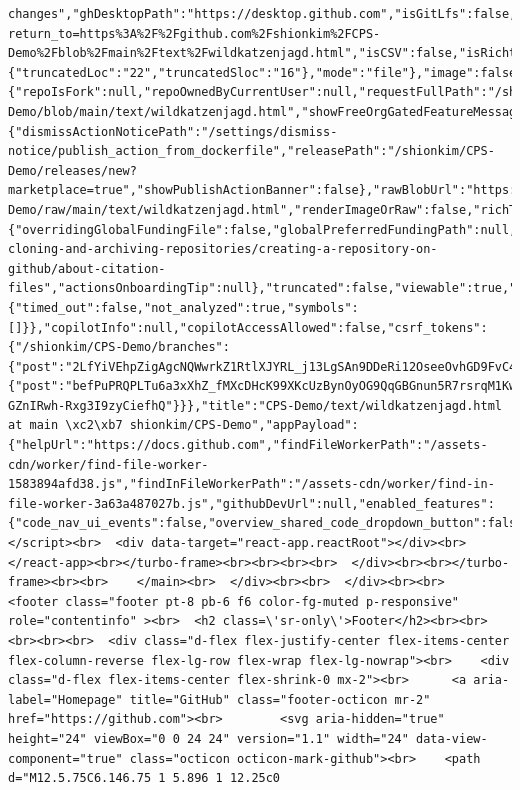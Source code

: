 \documentclass[
  letterpaper,
]{book}
\begin{document}
\begin{verbatim}
changes","ghDesktopPath":"https://desktop.github.com","isGitLfs":false,"onBranch":true,"shortPath":"0c9c3e5","siteNavLoginPath":"/login?return_to=https%3A%2F%2Fgithub.com%2Fshionkim%2FCPS-Demo%2Fblob%2Fmain%2Ftext%2Fwildkatzenjagd.html","isCSV":false,"isRichtext":false,"toc":null,"lineInfo":{"truncatedLoc":"22","truncatedSloc":"16"},"mode":"file"},"image":false,"isCodeownersFile":null,"isPlain":false,"isValidLegacyIssueTemplate":false,"issueTemplate":null,"discussionTemplate":null,"language":"HTML","languageID":146,"large":false,"planSupportInfo":{"repoIsFork":null,"repoOwnedByCurrentUser":null,"requestFullPath":"/shionkim/CPS-Demo/blob/main/text/wildkatzenjagd.html","showFreeOrgGatedFeatureMessage":null,"showPlanSupportBanner":null,"upgradeDataAttributes":null,"upgradePath":null},"publishBannersInfo":{"dismissActionNoticePath":"/settings/dismiss-notice/publish_action_from_dockerfile","releasePath":"/shionkim/CPS-Demo/releases/new?marketplace=true","showPublishActionBanner":false},"rawBlobUrl":"https://github.com/shionkim/CPS-Demo/raw/main/text/wildkatzenjagd.html","renderImageOrRaw":false,"richText":null,"renderedFileInfo":null,"shortPath":null,"symbolsEnabled":true,"tabSize":8,"topBannersInfo":{"overridingGlobalFundingFile":false,"globalPreferredFundingPath":null,"showInvalidCitationWarning":false,"citationHelpUrl":"https://docs.github.com/github/creating-cloning-and-archiving-repositories/creating-a-repository-on-github/about-citation-files","actionsOnboardingTip":null},"truncated":false,"viewable":true,"workflowRedirectUrl":null,"symbols":{"timed_out":false,"not_analyzed":true,"symbols":[]}},"copilotInfo":null,"copilotAccessAllowed":false,"csrf_tokens":{"/shionkim/CPS-Demo/branches":{"post":"2LfYiVEhpZigAgcNQWwrkZ1RtlXJYRL_j13LgSAn9DDeRi12OseeOvhGD9FvC4B1_Qn0XVb1ErqIkiQjMWfDoA"},"/repos/preferences":{"post":"befPuPRQPLTu6a3xXhZ_fMXcDHcK99XKcUzBynOyOG9QqGBGnun5R7rsrqM1Kwd-GZnIRwh-Rxg3I9zyCiefhQ"}}},"title":"CPS-Demo/text/wildkatzenjagd.html at main \xc2\xb7 shionkim/CPS-Demo","appPayload":{"helpUrl":"https://docs.github.com","findFileWorkerPath":"/assets-cdn/worker/find-file-worker-1583894afd38.js","findInFileWorkerPath":"/assets-cdn/worker/find-in-file-worker-3a63a487027b.js","githubDevUrl":null,"enabled_features":{"code_nav_ui_events":false,"overview_shared_code_dropdown_button":false,"react_blob_overlay":false,"copilot_conversational_ux_embedding_update":false,"copilot_smell_icebreaker_ux":true,"copilot_workspace":false}}}</script><br>  <div data-target="react-app.reactRoot"></div><br></react-app><br></turbo-frame><br><br><br><br>  </div><br><br></turbo-frame><br><br>    </main><br>  </div><br><br>  </div><br><br>          <footer class="footer pt-8 pb-6 f6 color-fg-muted p-responsive" role="contentinfo" ><br>  <h2 class=\'sr-only\'>Footer</h2><br><br>  <br><br><br>  <div class="d-flex flex-justify-center flex-items-center flex-column-reverse flex-lg-row flex-wrap flex-lg-nowrap"><br>    <div class="d-flex flex-items-center flex-shrink-0 mx-2"><br>      <a aria-label="Homepage" title="GitHub" class="footer-octicon mr-2" href="https://github.com"><br>        <svg aria-hidden="true" height="24" viewBox="0 0 24 24" version="1.1" width="24" data-view-component="true" class="octicon octicon-mark-github"><br>    <path d="M12.5.75C6.146.75 1 5.896 1 12.25c0 
\end{verbatim}
\end{document}
